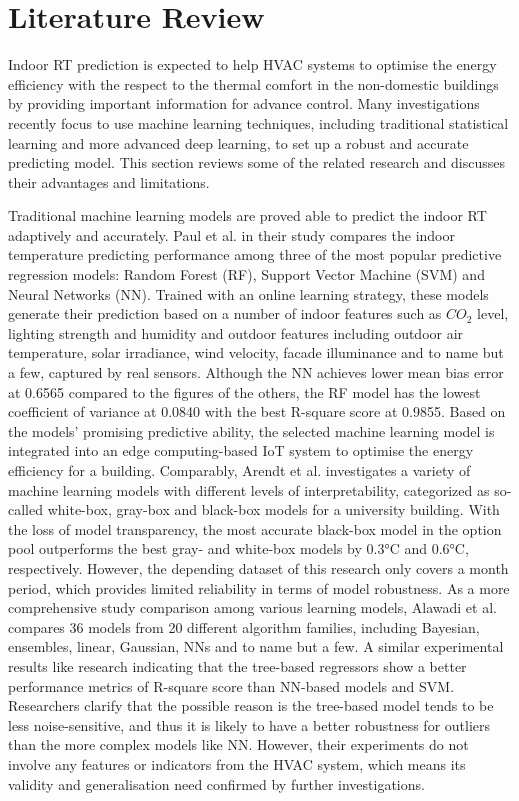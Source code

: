 \documentclass[11pt]{article}
\begin{document}
\section{Literature Review}

Indoor RT prediction is expected to help HVAC systems to optimise the energy efficiency with the respect to the thermal comfort in the non-domestic buildings by providing important information for advance control. Many investigations recently focus to use machine learning techniques, including traditional statistical learning and more advanced deep learning, to set up a robust and accurate predicting model. This section reviews some of the related research and discusses their advantages and limitations.

Traditional machine learning models are proved able to predict the indoor RT adaptively and accurately. Paul et al. in their study \citep{paul2018iot} compares the indoor temperature predicting performance among three of the most popular predictive regression models: Random Forest (RF), Support Vector Machine (SVM) and Neural Networks (NN). Trained with an online learning strategy, these models generate their prediction based on a number of indoor features such as $CO_2$ level, lighting strength and humidity and outdoor features including outdoor air temperature, solar irradiance, wind velocity, facade illuminance and to name but a few, captured by real sensors. Although the NN achieves lower mean bias error at 0.6565 compared to the figures of the others, the RF model has the lowest coefficient of variance at 0.0840 with the best R-square score at 0.9855. Based on the models’ promising predictive ability, the selected machine learning model is integrated into an edge computing-based IoT system to optimise the energy efficiency for a building. Comparably, Arendt et al. investigates a variety of machine learning models with different levels of interpretability, categorized as so-called white-box, gray-box and black-box models for a university building\citep{arendt2018comparative}. With the loss of model transparency, the most accurate black-box model in the option pool outperforms the best gray- and white-box models by 0.3°C and 0.6°C, respectively. However, the depending dataset of this research only covers a month period, which provides limited reliability in terms of model robustness. As a more comprehensive study comparison among various learning models\citep{alawadi2020comparison},  Alawadi et al. compares 36 models from 20 different algorithm families, including Bayesian, ensembles, linear, Gaussian, NNs and to name but a few. A similar experimental results like research \citep{paul2018iot} indicating that the tree-based regressors show a better performance metrics of R-square score than NN-based models and SVM. Researchers clarify that the possible reason is the tree-based model tends to be less noise-sensitive, and thus it is likely to have a better robustness for outliers than the more complex models like NN. However, their experiments do not involve any features or indicators from the HVAC system, which means its validity and generalisation need confirmed by further investigations.
\end{document}

